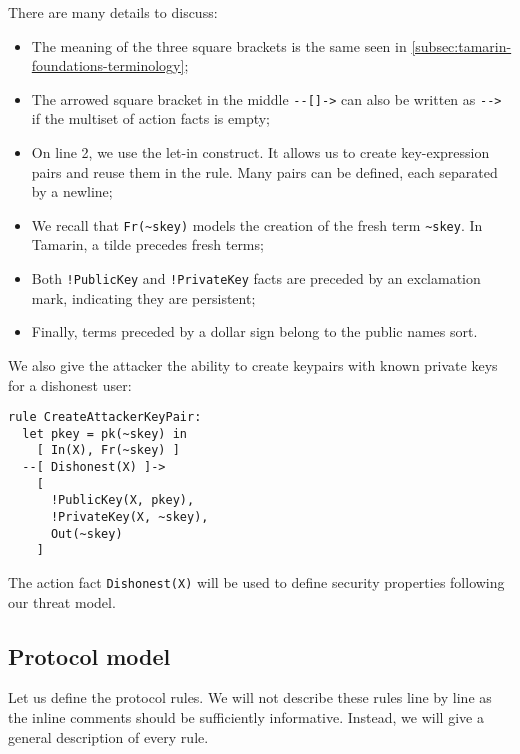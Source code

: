 There are many details to discuss:
\begin{itemize}
  \item The meaning of the three square brackets is the same seen in \cref{subsec:tamarin-foundations-terminology};
  \item The arrowed square bracket in the middle \lstinline{--[]->} can also be written as \lstinline{-->} if the multiset of action facts is empty;
  \item On line 2, we use the let-in construct. It allows us to create key-expression pairs and reuse them in the rule. Many pairs can be defined, each separated by a newline;
  \item We recall that \lstinline{Fr(~skey)} models the creation of the fresh term \lstinline{~skey}. In Tamarin, a tilde precedes fresh terms;
  \item Both \lstinline{!PublicKey} and \lstinline{!PrivateKey} facts are preceded by an exclamation mark, indicating they are persistent;
  \item Finally, terms preceded by a dollar sign belong to the public names sort.
\end{itemize}

We also give the attacker the ability to create keypairs with known private keys for a dishonest user:

\begin{lstlisting}
rule CreateAttackerKeyPair:
  let pkey = pk(~skey) in
    [ In(X), Fr(~skey) ]
  --[ Dishonest(X) ]->
    [
      !PublicKey(X, pkey),
      !PrivateKey(X, ~skey),
      Out(~skey)
    ]
\end{lstlisting}

The action fact \lstinline{Dishonest(X)} will be used to define security properties following our threat model.

\subsection{Protocol model}
Let us define the protocol rules. We will not describe these rules line by line as the inline comments should be sufficiently informative. Instead, we will give a general description of every rule.

